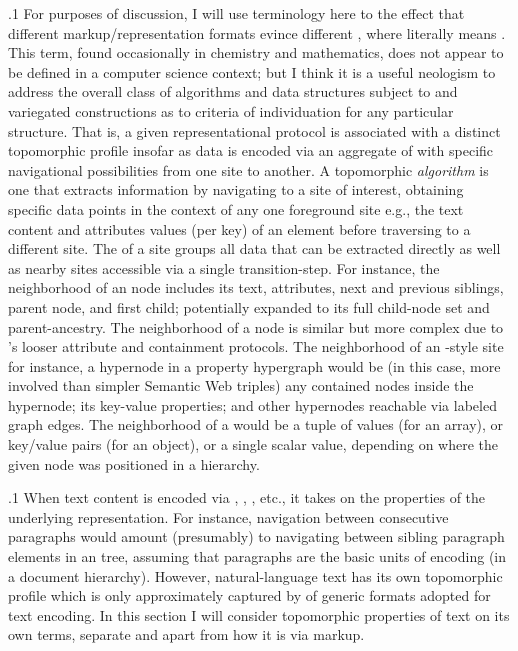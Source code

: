 \documentclass[11pt, twocolumn]{article}
\begin{document}
\p.1{%
For purposes of discussion, I will use terminology here to the
effect that different markup/representation formats
evince different , where 
literally means . This term,
found occasionally in chemistry and mathematics, does
not appear to be defined in a computer science context;
but I think it is a useful neologism to address the
overall class of algorithms and data structures subject
to  and variegated constructions
as to criteria of individuation for any particular structure.
That is, a given representational protocol is associated
with a distinct topomorphic profile insofar as
data is encoded via an aggregate of  with
specific navigational possibilities from one site
to another. A topomorphic \textit{algorithm} is one
that extracts information by navigating to a site
of interest, obtaining specific data points
in the context of any one foreground site \mdash{} e.g., the
text content and attributes values (per key) of an
 element \mdash{} before traversing to a different site.
The  of a site groups all data that
can be extracted directly as well as nearby sites
accessible via a single transition-step. For
instance, the neighborhood of an  node
includes its text, attributes, next and previous
siblings, parent node, and first child; potentially
expanded to its full child-node set and
parent-ancestry.
The neighborhood of a  node is similar but
more complex due to 's looser attribute and
containment protocols. The neighborhood of an
-style site \mdash{} for instance, a hypernode
in a property hypergraph \mdash{} would be
(in this case, more involved than simpler
Semantic Web triples) any contained nodes
inside the hypernode; its key-value properties;
and other hypernodes reachable via labeled
graph edges. The neighborhood of a
  would be a tuple of values
(for an array), or key/value pairs (for an object),
or a single scalar value, depending on where the given
node was positioned in a  hierarchy.
}%

\p.1{%
When text content is encoded via , , , etc.,
it takes on the  properties of the
underlying representation. For instance,
navigation between consecutive paragraphs would amount
(presumably) to navigating between sibling paragraph
elements in an  tree, assuming that paragraphs
are the basic units of encoding (in a document hierarchy). However, natural-language
text has its own topomorphic profile which is only
approximately captured by  of
generic formats adopted for text encoding. In this
section I will consider topomorphic properties of
text on its own terms, separate and apart from
how it is  via markup.
}%
\end{document}
